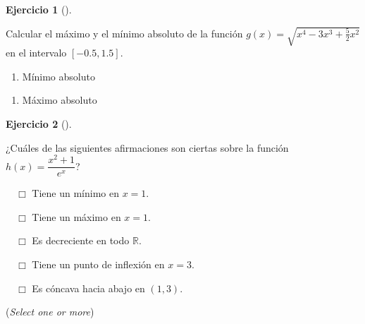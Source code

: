\documentclass[
  a4paper,
]{scrreport}
\providecommand{\tightlist}{%
  \setlength{\itemsep}{0pt}\setlength{\parskip}{0pt}}\usepackage{longtable,booktabs,array}
\theoremstyle{definition}
\newtheorem{exercise}{Ejercicio}[chapter]
\theoremstyle{remark}
\begin{document}
\leavevmode{}%
\begin{exercise}[]\label{exr-extremos-absolutos}

Calcular el máximo y el mínimo absoluto de la función
\(g(x)=\sqrt{x^4-3x^3+\frac{5}{2}x^2}\) en el intervalo \([-0.5,1.5]\).

\begin{enumerate}
\def\labelenumi{\alph{enumi}.}
\tightlist
\item
  Mínimo absoluto
\end{enumerate}

\vspace{18pt}

\begin{enumerate}
\def\labelenumi{\alph{enumi}.}
\setcounter{enumi}{1}
\tightlist
\item
  Máximo absoluto
\end{enumerate}

\vspace{18pt}

\end{exercise}

\leavevmode{}%
\begin{exercise}[]\label{exr-extremos-puntos-inflexion}

¿Cuáles de las siguientes afirmaciones son ciertas sobre la función
\(h(x)=\dfrac{x^2+1}{e^x}\)?

${\quad\Box}$ Tiene un mínimo en $x=1$.

${\quad\Box}$ Tiene un máximo en $x=1$.

${\quad\Box}$ Es decreciente en todo $\mathbb{R}$.

${\quad\Box}$ Tiene un punto de inflexión en $x=3$.

${\quad\Box}$ Es cóncava hacia abajo en $(1,3)$.

(\emph{Select one or more})

\end{exercise}
\end{document}
